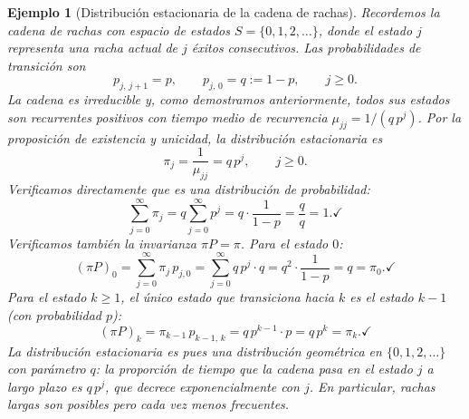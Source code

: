 \documentclass[12pt]{book}
\newtheorem{example}{Ejemplo}[chapter]
\begin{document}
\begin{example}[Distribución estacionaria de la cadena de rachas]
    Recordemos la cadena de rachas con espacio de estados $S = \{0, 1, 2, \dots\}$, donde el estado $j$ representa una racha actual de $j$ éxitos consecutivos. Las probabilidades de transición son
    \[
        p_{j,\,j+1} = p, \qquad p_{j,\,0} = q := 1-p, \qquad j \ge 0.
    \]
    La cadena es irreducible y, como demostramos anteriormente, todos sus estados son recurrentes positivos con tiempo medio de recurrencia $\mu_{jj} = 1/(q\,p^j)$. Por la proposición de existencia y unicidad, la distribución estacionaria es
    \[
        \pi_j = \frac{1}{\mu_{jj}} = q\,p^j, \qquad j \ge 0.
    \]
    Verificamos directamente que es una distribución de probabilidad:
    \[
        \sum_{j=0}^{\infty} \pi_j = q \sum_{j=0}^{\infty} p^j = q \cdot \frac{1}{1-p} = \frac{q}{q} = 1. \checkmark
    \]
    Verificamos también la invarianza $\pi P = \pi$. Para el estado $0$:
    \[
        (\pi P)_0 = \sum_{j=0}^{\infty} \pi_j\, p_{j,0} = \sum_{j=0}^{\infty} q\,p^j \cdot q = q^2 \cdot \frac{1}{1-p} = q = \pi_0. \checkmark
    \]
    Para el estado $k \ge 1$, el único estado que transiciona hacia $k$ es el estado $k-1$ (con probabilidad $p$):
    \[
        (\pi P)_k = \pi_{k-1}\, p_{k-1,\,k} = q\,p^{k-1} \cdot p = q\,p^k = \pi_k. \checkmark
    \]
    La distribución estacionaria es pues una distribución geométrica en $\{0,1,2,\dots\}$ con parámetro $q$: la proporción de tiempo que la cadena pasa en el estado $j$ a largo plazo es $q\,p^j$, que decrece exponencialmente con $j$. En particular, rachas largas son posibles pero cada vez menos frecuentes.
\end{example}
\end{document}
